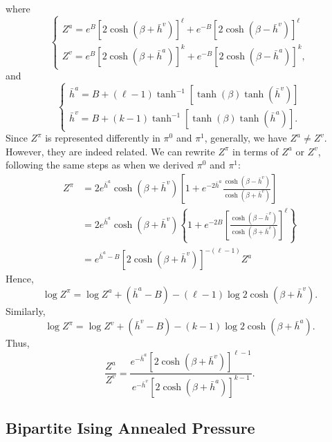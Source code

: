 \documentclass[12pt]{article}
\numberwithin{equation}{section}
\begin{document}
where
\begin{equation}
    \begin{cases}
        Z^a = e^{B}[2\cosh(\beta + \bar{h}^v)]^\ell + e^{-B}[2\cosh(\beta - \bar{h}^v)]^\ell \\
        Z^v = e^{B}[2\cosh(\beta + \bar{h}^a)]^k + e^{-B}[2\cosh(\beta - \bar{h}^a)]^k,
    \end{cases}
\end{equation}
and
\begin{equation*}
    \begin{cases}
        \bar{h}^a = B + (\ell - 1)\tanh^{-1}[\tanh(\beta)\tanh(\bar{h}^v)] \\
        \bar{h}^v = B + (k - 1)\tanh^{-1}[\tanh(\beta)\tanh(\bar{h}^a)].
    \end{cases}
\end{equation*}
Since $Z^\pi$ is represented differently in $\pi^0$ and $\pi^1$, generally, we have $Z^a \neq Z^v$. However, they are indeed related.
We can rewrite $Z^\pi$ in terms of $Z^a$ or $Z^v$, following the same steps as when we derived $\pi^0$ and $\pi^1$:
\begin{align*}
    Z^\pi & = 2e^{\bar{h}^a} \cosh(\beta + \bar{h}^v)\left[1 + e^{-2\bar{h}^a}\frac{\cosh(\beta - \bar{h}^v)}{\cosh(\beta + \bar{h}^v)}\right]             \\
          & = 2e^{\bar{h}^a} \cosh(\beta + \bar{h}^v)\left\{1 + e^{-2B}\left[\frac{\cosh(\beta - \bar{h}^v)}{\cosh(\beta + \bar{h}^v)}\right]^\ell\right\} \\
          & = e^{\bar{h}^a - B}[2\cosh(\beta + \bar{h}^v)]^{-(\ell - 1)} Z^a
\end{align*}
Hence,
\begin{equation}
    \log Z^\pi = \log Z^a + (\bar{h}^a - B) - (\ell - 1) \log 2\cosh(\beta + \bar{h}^v).
    \label{Eq.ISBP-Zpi-Za}
\end{equation}
Similarly,
\begin{equation}
    \log Z^\pi = \log Z^v + (\bar{h}^v - B) - (k - 1) \log 2\cosh(\beta + \bar{h}^a).
    \label{Eq.ISBP-Zpi-Zv}
\end{equation}
Thus,
\begin{equation}
    \frac{Z^a}{Z^v} = \frac{e^{-\bar{h}^a}[2\cosh(\beta + \bar{h}^v)]^{\ell - 1}}{e^{-\bar{h}^v}[2\cosh(\beta + \bar{h}^a)]^{k - 1}}.
\end{equation}

\subsection{Bipartite Ising Annealed Pressure}
\end{document}
